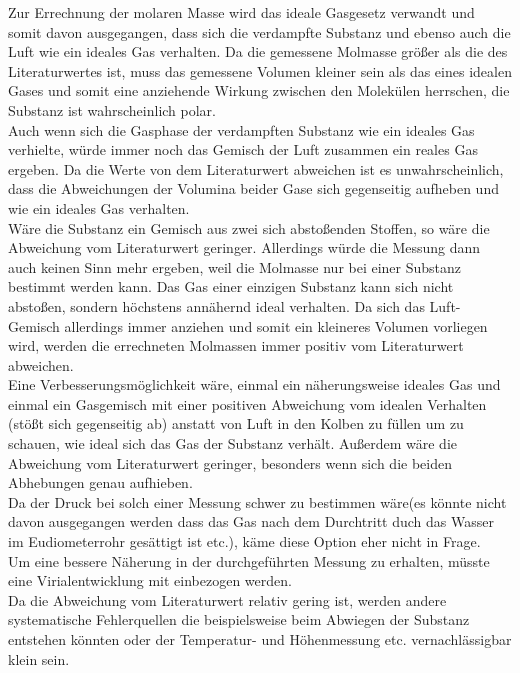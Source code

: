 \documentclass[12pt,a4paper,titlepage,headinclude,bibtotoc]{scrartcl}
\begin{document}
Zur Errechnung der molaren Masse wird das ideale Gasgesetz verwandt und somit davon ausgegangen, dass sich die verdampfte Substanz und ebenso auch die Luft wie ein ideales Gas verhalten. Da die gemessene Molmasse größer als die des Literaturwertes ist, muss das gemessene Volumen kleiner sein als das eines idealen Gases und somit eine anziehende Wirkung zwischen den Molekülen herrschen, die Substanz ist wahrscheinlich polar. \\
Auch wenn sich die Gasphase der verdampften Substanz wie ein ideales Gas verhielte, würde immer noch das Gemisch der Luft zusammen ein reales Gas ergeben. Da die Werte von dem Literaturwert abweichen ist es unwahrscheinlich, dass die Abweichungen der Volumina beider Gase sich gegenseitig aufheben und wie ein ideales Gas verhalten. \\
Wäre die Substanz ein Gemisch aus zwei sich abstoßenden Stoffen, so wäre die Abweichung vom Literaturwert geringer. Allerdings würde die Messung dann auch keinen Sinn mehr ergeben, weil die Molmasse nur bei einer Substanz bestimmt werden kann. Das Gas einer einzigen Substanz kann sich nicht abstoßen, sondern höchstens annähernd ideal verhalten. Da sich das Luft-Gemisch allerdings immer anziehen und somit ein kleineres Volumen vorliegen wird, werden die errechneten Molmassen immer positiv vom Literaturwert abweichen.\\
Eine Verbesserungsmöglichkeit wäre, einmal ein näherungsweise ideales Gas und einmal ein Gasgemisch mit einer positiven Abweichung vom idealen Verhalten (stößt sich gegenseitig ab) anstatt von Luft in den Kolben zu füllen um zu schauen, wie ideal sich das Gas der Substanz verhält. Außerdem wäre die Abweichung vom Literaturwert geringer, besonders wenn sich die beiden Abhebungen genau aufhieben. \\

Da  der Druck bei solch einer Messung schwer zu bestimmen wäre(es könnte nicht davon ausgegangen werden dass das Gas nach dem Durchtritt duch das Wasser im Eudiometerrohr gesättigt ist etc.), käme diese Option eher nicht in Frage.\\
Um eine bessere Näherung in der durchgeführten Messung zu erhalten, müsste eine Virialentwicklung mit einbezogen werden.\\

Da die Abweichung vom Literaturwert relativ gering ist, werden andere systematische Fehlerquellen die beispielsweise beim Abwiegen der Substanz entstehen könnten oder der Temperatur- und Höhenmessung etc. vernachlässigbar klein sein. 
\end{document}

